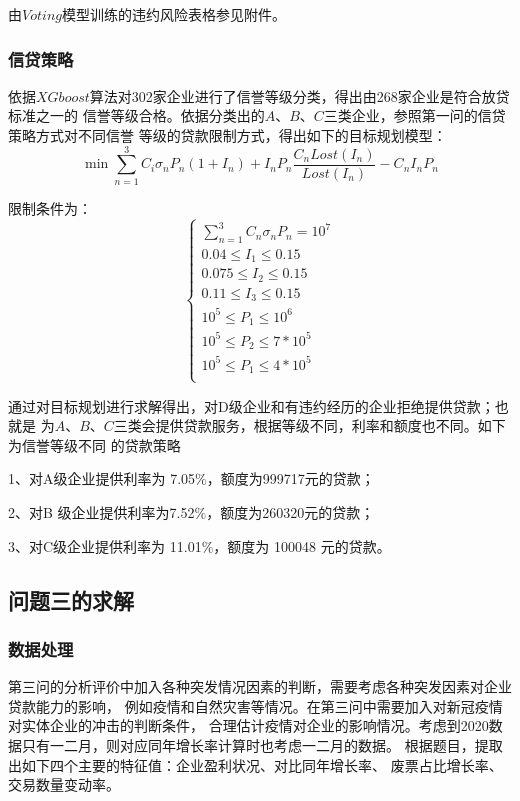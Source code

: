 \documentclass[UTF8]{ctexart}
\begin{document}
			由$Voting$模型训练的违约风险表格参见附件。
		
			\subsubsection{信贷策略}
			依据$XGboost$算法对302家企业进行了信誉等级分类，得出由268家企业是符合放贷标准之一的
			信誉等级合格。依据分类出的$A$、$B$、$C$三类企业，参照第一问的信贷策略方式对不同信誉
			等级的贷款限制方式，得出如下的目标规划模型：
			\begin{equation}
				\min \sum_{n = 1}^{3}C_i\sigma_n P_n (1+I_n)+I_n P_n \frac{C_n Lost(I_n)}{Lost(I_n)}-C_n I_n P_n  
			\end{equation}
			
			\newpage
			
			限制条件为：
			\[\left\{\begin{array}{lllll}
				\sum_{n = 1}^{3}C_n \sigma_n P_n = 10^7 \\
				0.04 \le I_1 \le 0.15\\
				0.075 \le I_2 \le 0.15\\
				0.11 \le I_3 \le 0.15\\
				10^5 \le P_1 \le 10^6\\
				10^5 \le P_2 \le 7*10^5\\
				10^5 \le P_1 \le 4*10^5\\
		
				\end{array}\right. \]
		
			通过对目标规划进行求解得出，对D级企业和有违约经历的企业拒绝提供贷款；也就是
			为$A$、$B$、$C$三类会提供贷款服务，根据等级不同，利率和额度也不同。如下为信誉等级不同
			的贷款策略
			
			1、对A级企业提供利率为 7.05$\%$，额度为999717元的贷款；
		
			2、对B 级企业提供利率为7.52$\%$，额度为260320元的贷款；
			
			3、对C级企业提供利率为 11.01$\%$，额度为 100048 元的贷款。
		\subsection{问题三的求解}
		\subsubsection{数据处理}
		第三问的分析评价中加入各种突发情况因素的判断，需要考虑各种突发因素对企业贷款能力的影响，
		例如疫情和自然灾害等情况。在第三问中需要加入对新冠疫情对实体企业的冲击的判断条件，
		合理估计疫情对企业的影响情况。考虑到2020数据只有一二月，则对应同年增长率计算时也考虑一二月的数据。
		根据题目，提取出如下四个主要的特征值：企业盈利状况、对比同年增长率、
		废票占比增长率、交易数量变动率。
		
\end{document}
